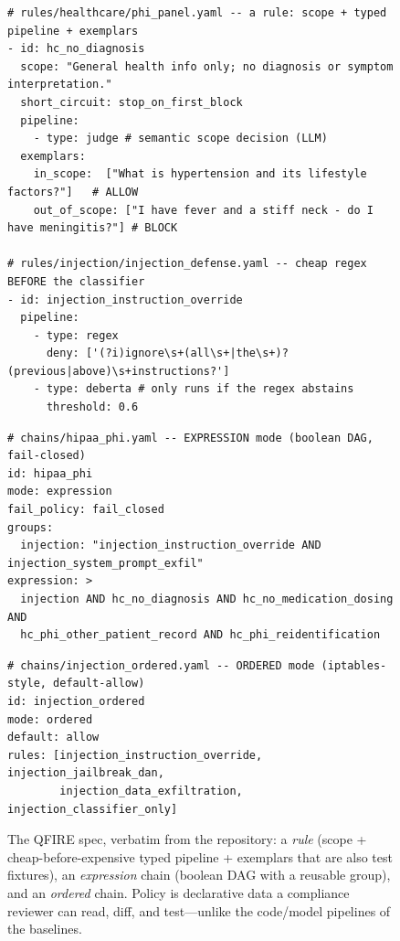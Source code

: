 \documentclass[11pt]{article}
\begin{document}
\begin{figure}[H]
\centering
\begin{tcolorbox}[cardcol=cardblue, policycard,
  title={Rule\hfill\normalfont\footnotesize\itshape scope, cheap-before-expensive pipeline, exemplars (also test fixtures)}]
\begin{lstlisting}[style=qfireyamlbare]
# rules/healthcare/phi_panel.yaml -- a rule: scope + typed pipeline + exemplars
- id: hc_no_diagnosis
  scope: "General health info only; no diagnosis or symptom interpretation."
  short_circuit: stop_on_first_block
  pipeline:
    - type: judge # semantic scope decision (LLM)
  exemplars:
    in_scope:  ["What is hypertension and its lifestyle factors?"]   # ALLOW
    out_of_scope: ["I have fever and a stiff neck - do I have meningitis?"] # BLOCK

# rules/injection/injection_defense.yaml -- cheap regex BEFORE the classifier
- id: injection_instruction_override
  pipeline:
    - type: regex
      deny: ['(?i)ignore\s+(all\s+|the\s+)?(previous|above)\s+instructions?']
    - type: deberta # only runs if the regex abstains
      threshold: 0.6
\end{lstlisting}
\end{tcolorbox}

\vspace{6pt}
\begin{tcolorbox}[cardcol=cardpurple, policycard,
  title={Expression chain\hfill\normalfont\footnotesize\itshape boolean DAG, reusable group, fail-closed}]
\begin{lstlisting}[style=qfireyamlbare]
# chains/hipaa_phi.yaml -- EXPRESSION mode (boolean DAG, fail-closed)
id: hipaa_phi
mode: expression
fail_policy: fail_closed
groups:
  injection: "injection_instruction_override AND injection_system_prompt_exfil"
expression: >
  injection AND hc_no_diagnosis AND hc_no_medication_dosing AND
  hc_phi_other_patient_record AND hc_phi_reidentification
\end{lstlisting}
\end{tcolorbox}

\vspace{6pt}
\begin{tcolorbox}[cardcol=cardteal, policycard,
  title={Ordered chain\hfill\normalfont\footnotesize\itshape iptables-style, default-allow}]
\begin{lstlisting}[style=qfireyamlbare]
# chains/injection_ordered.yaml -- ORDERED mode (iptables-style, default-allow)
id: injection_ordered
mode: ordered
default: allow
rules: [injection_instruction_override, injection_jailbreak_dan,
        injection_data_exfiltration, injection_classifier_only]
\end{lstlisting}
\end{tcolorbox}
\caption{The QFIRE spec, verbatim from the repository: a \emph{rule}
(scope + cheap-before-expensive typed pipeline + exemplars that are also test
fixtures), an \emph{expression} chain (boolean DAG with a reusable group), and an
\emph{ordered} chain. Policy is declarative data a compliance reviewer can read,
diff, and test---unlike the code/model pipelines of the baselines.}
\label{fig:spec}
\end{figure}
\end{document}
